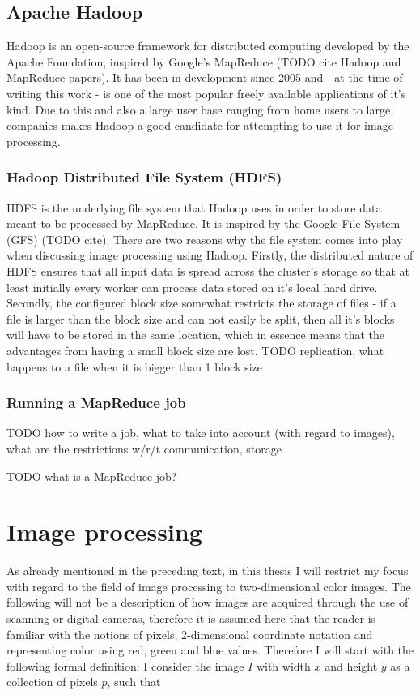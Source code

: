 \documentclass [12pt,a4paper]{report}
\begin{document}
\subsection{Apache Hadoop}
Hadoop is an open-source framework for distributed computing developed by the Apache Foundation, inspired by Google's MapReduce (TODO cite Hadoop and MapReduce papers). It has been in development since 2005 and - at the time of writing this work - is one of the most popular freely available applications of it's kind. Due to this and also a large user base ranging from home users to large companies makes Hadoop a good candidate for attempting to use it for image processing.

\subsubsection{Hadoop Distributed File System (HDFS)}
HDFS is the underlying file system that Hadoop uses in order to store data meant to be processed by MapReduce. It is inspired by the Google File System (GFS) (TODO cite). There are two reasons why the file system comes into play when discussing image processing using Hadoop. Firstly, the distributed nature of HDFS ensures that all input data is spread across the cluster's storage so that at least initially every worker can process data stored on it's local hard drive. Secondly, the configured block size somewhat restricts the storage of files - if a file is larger than the block size and can not easily be split, then all it's blocks will have to be stored in the same location, which in essence means that the advantages from having a small block size are lost.
TODO replication, what happens to a file when it is bigger than 1 block size

\subsubsection{Running a MapReduce job}

TODO how to write a job, what to take into account (with regard to images), what are the restrictions w/r/t communication, storage

TODO what is a MapReduce job?

\section{Image processing}

As already mentioned in the preceding text, in this thesis I will restrict my focus with regard to the field of image processing to two-dimensional color images. The following will not be a description of how images are acquired through the use of scanning or digital cameras, therefore it is assumed here that the reader is familiar with the notions of pixels, 2-dimensional coordinate notation and representing color using red, green and blue values. Therefore I will start with the following formal definition: I consider the image $I$ with width $x$ and height $y$ as a collection of pixels $p$, such that
\end{document}
